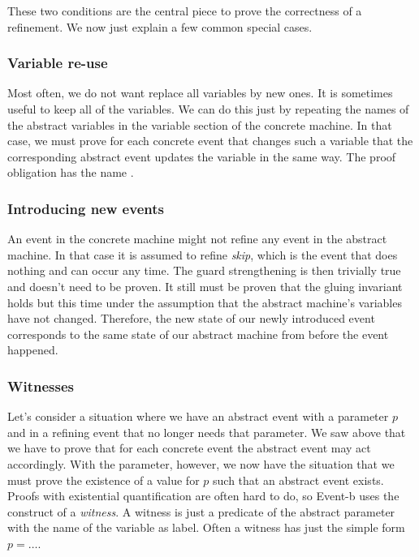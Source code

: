 These two conditions are the central piece to prove the correctness of a refinement. We now just explain a few
common special cases.

\subsubsection{Variable re-use}
\label{tutorial:variable_reuse}
Most often, we do not want replace all variables by new ones. It is sometimes useful to keep all of the variables.
We can do this just by repeating the names of the abstract variables in the variable section of the concrete
machine. In that case, we must prove for each concrete event that changes such a variable that the corresponding 
abstract event updates the variable in the same way.
The proof obligation has the name .

\subsubsection{Introducing new events}
\label{tutorial:skip}
An event in the concrete machine might not refine any event in the abstract machine. In that case it is assumed
to refine \emph{skip}, which is the event that does nothing and can occur any time. 
The guard strengthening is then trivially true and doesn't need to be proven.
It still must be proven that the gluing invariant holds but this time under the assumption that the abstract machine's
variables have not changed. Therefore, the new state of our newly introduced event corresponds to the same state of
our abstract machine from before the event happened.

\subsubsection{Witnesses}
\label{tutorial:witnesses}
Let's consider a situation where we have an abstract event with a parameter $p$ and in a refining event that no longer needs that parameter.
We saw above that we have to prove that for each concrete event the abstract event may act accordingly.
With the parameter, however, we now have the situation that we must prove the existence of a value for $p$ such
that an abstract event exists. Proofs with existential quantification are often hard to do, so Event-b 
uses the construct of a \emph{witness}. A witness is just a predicate of the abstract parameter with the
name of the variable as label. Often a witness has just the simple form $p = \ldots$.


